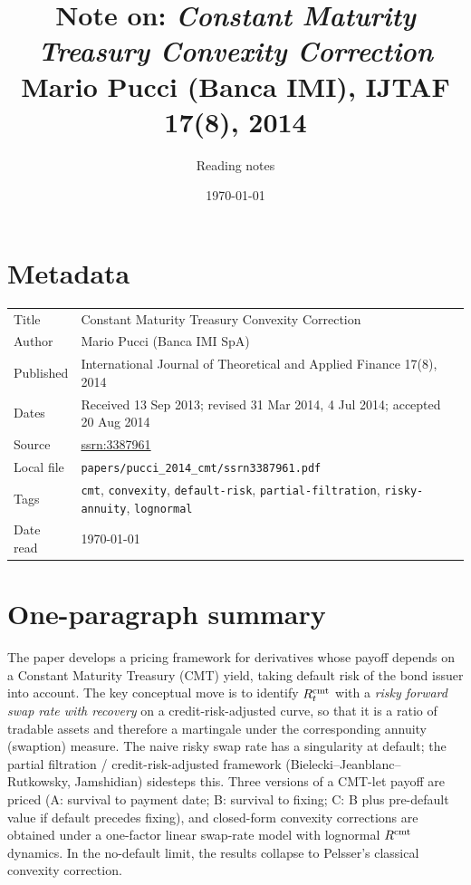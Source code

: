 \documentclass[11pt,a4paper]{article}
\title{Note on: \emph{Constant Maturity Treasury Convexity Correction}\\
       \large Mario Pucci (Banca IMI), IJTAF 17(8), 2014}
\author{Reading notes}
\date{\today}
\begin{document}
\maketitle

\section*{Metadata}
\begin{tabular}{@{}p{3.5cm}p{11cm}@{}}
\toprule
Title           & Constant Maturity Treasury Convexity Correction \\
Author          & Mario Pucci (Banca IMI SpA) \\
Published       & International Journal of Theoretical and Applied Finance 17(8), 2014 \\
Dates           & Received 13 Sep 2013; revised 31 Mar 2014, 4 Jul 2014; accepted 20 Aug 2014 \\
Source          & \href{https://ssrn.com/abstract=3387961}{ssrn:3387961} \\
Local file      & \texttt{papers/pucci\_2014\_cmt/ssrn3387961.pdf} \\
Tags            & \texttt{cmt}, \texttt{convexity}, \texttt{default-risk},
                  \texttt{partial-filtration}, \texttt{risky-annuity}, \texttt{lognormal} \\
Date read       & \today \\
\bottomrule
\end{tabular}

\section*{One-paragraph summary}
The paper develops a pricing framework for derivatives whose payoff
depends on a Constant Maturity Treasury (CMT) yield, taking default
risk of the bond issuer into account. The key conceptual move is to
identify $R^{\mathrm{cmt}}_t$ with a \emph{risky forward swap rate with recovery}
on a credit-risk-adjusted curve, so that it is a ratio of tradable
assets and therefore a martingale under the corresponding annuity
(swaption) measure. The naive risky swap rate has a singularity at
default; the partial filtration / credit-risk-adjusted framework
(Bielecki--Jeanblanc--Rutkowsky, Jamshidian) sidesteps this. Three
versions of a CMT-let payoff are priced (A: survival to payment date;
B: survival to fixing; C: B plus pre-default value if default precedes
fixing), and closed-form convexity corrections are obtained under a
one-factor linear swap-rate model with lognormal $R^{\mathrm{cmt}}$ dynamics. In
the no-default limit, the results collapse to Pelsser's classical
convexity correction.
\end{document}
